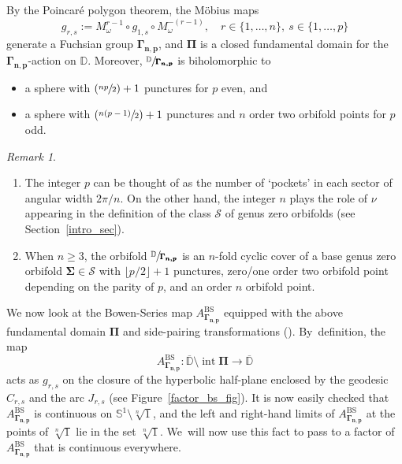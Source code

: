 \documentclass[JEP,XML,SOM,Unicode,NoFloatCountersInSection,published]{cedram}
\newcommand{\Psfrac}[2]{(\sfrac{#1}{#2})}
\let\faktor\sfrac
\theoremstyle{definition}
\theoremstyle{remark}
\newtheorem{remark}[lemma]{Remark}
\newcommand{\D}{\mathbb{D}}
\newcommand{\cS}{\mathcal{S}}
\DeclareMathOperator{\Int}{int}
\begin{document}
By the Poincaré polygon theorem, the Möbius maps
\[
g_{r,s}:=M_\omega^{r-1}\circ g_{1,s}\circ M_{\omega}^{-(r-1)},\quad r\in\{1,\dots,n\},\ s\in\{1,\dots,p\}
\]
generate a Fuchsian group $\pmb{\Gamma_{n,p}}$, and $\pmb{\Pi}$ is a closed fundamental domain for the $\pmb{\Gamma_{n,p}}$\nobreakdash-action on $\D$. Moreover, $\faktor{\D}{\pmb{\Gamma_{n,p}}}$ is biholomorphic to

\begin{itemize}
\item
a sphere with $\Psfrac{np}{2}+1$ punctures for $p$ even, and

\item
a sphere with $\Psfrac{n(p-1)}{2}+1$ punctures and $n$ order two orbifold points for $p$ odd.
\end{itemize}

\skpt
\begin{remark}\label{reconcile_rem_1}
\begin{enumerate}
\item
The integer $p$ can be thought of as the number of `pockets' in each sector of angular width $2\pi/n$. On the other hand, the integer $n$ plays the role of $\nu$ appearing in the definition of the class $\cS$ of genus zero orbifolds (see Section~\ref{intro_sec}).

\item
When $n\geq 3$, the orbifold $\faktor{\D}{\pmb{\Gamma_{n,p}}}$ is an $n$-fold cyclic cover of a base genus zero orbifold $\pmb{\Sigma}\in\cS$ with $\lfloor p/2\rfloor +1$ punctures, zero/one order two orbifold point depending on the parity of $p$, and an order $n$ orbifold point.
\end{enumerate}
\end{remark}

We now look at the Bowen-Series map $A_{\pmb{\Gamma_{n,p}}}^{\mathrm{BS}}$ equipped with the above fundamental domain $\pmb{\Pi}$ and side-pairing transformations (\cf \cite{bowen_series}). By~definition, the map
\[
A_{\pmb{\Gamma_{n,p}}}^{\mathrm{BS}}:\overline{\D}\setminus\Int{\pmb{\Pi}}\to \overline{\D}
\]
acts as $g_{r,s}$ on the closure of the hyperbolic half-plane enclosed by the geodesic $C_{r,s}$ and the arc $J_{r,s}$ (see Figure~\ref{factor_bs_fig}).
It is now easily checked that $A_{\pmb{\Gamma_{n,p}}}^{\mathrm{BS}}$ is continuous on $\mathbb{S}^1\setminus\sqrt[n]{1}$, and the left and right-hand limits of $A_{\pmb{\Gamma_{n,p}}}^{\mathrm{BS}}$ at the points of $\sqrt[n]{1}$ lie in the set $\sqrt[n]{1}$. We~will now use this fact to pass to a factor of $A_{\pmb{\Gamma_{n,p}}}^{\mathrm{BS}}$ that is continuous everywhere.
\end{document}
